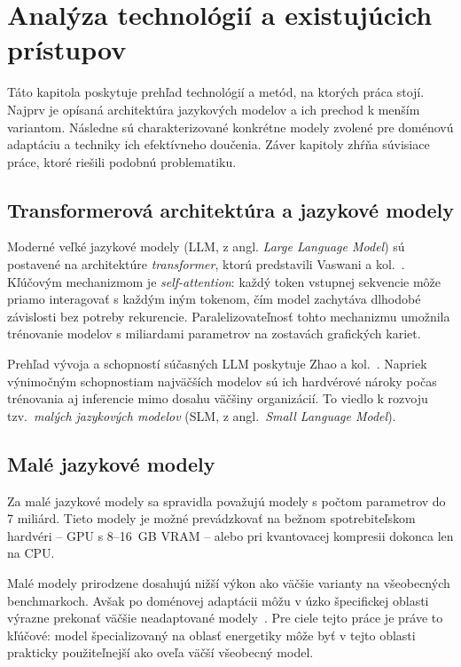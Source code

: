 
\chapter{Analýza technológií a existujúcich prístupov}\label{ch:analysis}

Táto kapitola poskytuje prehľad technológií a metód, na ktorých práca stojí. Najprv je opísaná architektúra jazykových modelov a ich prechod k menším variantom. Následne sú charakterizované konkrétne modely zvolené pre doménovú adaptáciu a techniky ich efektívneho doučenia. Záver kapitoly zhŕňa súvisiace práce, ktoré riešili podobnú problematiku.


\section{Transformerová architektúra a jazykové modely}

Moderné veľké jazykové modely (LLM, z angl. \emph{Large Language Model}) sú postavené na architektúre \emph{transformer}, ktorú predstavili Vaswani a kol.~\cite{Vaswani2017Attention}. Kľúčovým mechanizmom je \emph{self-attention}: každý token vstupnej sekvencie môže priamo interagovať s každým iným tokenom, čím model zachytáva dlhodobé závislosti bez potreby rekurencie. Paralelizovateľnosť tohto mechanizmu umožnila trénovanie modelov s miliardami parametrov na zostavách grafických kariet.

Prehľad vývoja a schopností súčasných LLM poskytuje Zhao a kol.~\cite{Zhao2023SurveyLLM}. Napriek výnimočným schopnostiam najväčších modelov sú ich hardvérové nároky počas trénovania aj inferencie mimo dosahu väčšiny organizácií. To viedlo k rozvoju tzv.\ \emph{malých jazykových modelov} (SLM, z angl.\ \emph{Small Language Model}).


\section{Malé jazykové modely}

Za malé jazykové modely sa spravidla považujú modely s počtom parametrov do 7 miliárd. Tieto modely je možné prevádzkovať na bežnom spotrebiteľskom hardvéri -- GPU s 8--16~GB VRAM -- alebo pri kvantovacej kompresii dokonca len na CPU.

Malé modely prirodzene dosahujú nižší výkon ako väčšie varianty na všeobecných benchmarkoch. Avšak po doménovej adaptácii môžu v úzko špecifickej oblasti výrazne prekonať väčšie neadaptované modely~\cite{Gururangan2020DontStop}. Pre ciele tejto práce je práve to kľúčové: model špecializovaný na oblasť energetiky môže byť v tejto oblasti prakticky použiteľnejší ako oveľa väčší všeobecný model.


